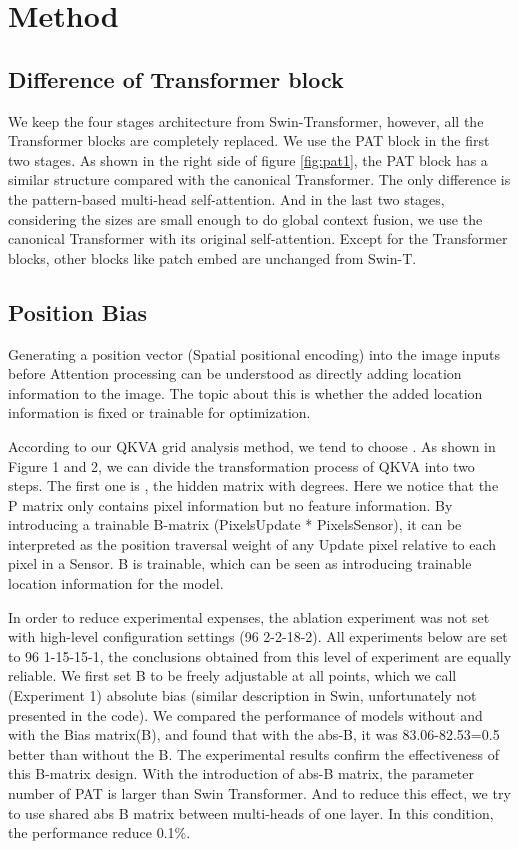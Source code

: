 \documentclass{article}
\theoremstyle{plain}
\theoremstyle{definition}
\theoremstyle{remark}
\begin{document}
\section{Method}
\subsection{Difference of Transformer block}
We keep the four stages architecture from Swin-Transformer, however, all the Transformer blocks are completely replaced. We use the PAT block in the first two stages. As shown in the right side of figure \ref{fig:pat1}, the PAT block has a similar structure compared with the canonical Transformer. The only difference is the pattern-based multi-head self-attention. And in the last two stages, considering the sizes are small enough to do global context fusion, we use the canonical Transformer with its original self-attention. Except for the Transformer blocks, other blocks like patch embed are unchanged from Swin-T.

\subsection{Position Bias}
Generating a position vector (Spatial positional encoding) into the image inputs before Attention processing can be understood as directly adding location information to the image. The topic about this is whether the added location information is fixed or trainable for optimization.

According to our QKVA grid analysis method, we tend to choose . As shown in Figure 1 and 2, we can divide the transformation process of QKVA into two steps. The first one is , the hidden matrix with  degrees. Here we notice that the P matrix only contains pixel information but no feature information. By introducing a trainable B-matrix (PixelsUpdate * PixelsSensor), it can be interpreted as the position traversal weight of any Update pixel relative to each pixel in a Sensor. B is trainable, which can be seen as introducing trainable location information for the model. 

In order to reduce experimental expenses, the ablation experiment was not set with high-level configuration settings (96 2-2-18-2). All experiments below are set to 96 1-15-15-1, the conclusions obtained from this level of experiment are equally reliable.
We first set B to be freely adjustable at all points, which we call (Experiment 1) absolute bias (similar description in Swin, unfortunately not presented in the code). We compared the performance of models without and with the Bias matrix(B), and found that with the abs-B, it was 83.06-82.53=0.5 better than without the B. The experimental results confirm the effectiveness of this B-matrix design. With the introduction of abs-B matrix, the parameter number of PAT is larger than Swin Transformer. And to reduce this effect, we try to use shared abs B matrix between multi-heads of one layer. In this condition, the performance reduce 0.1\%.
\end{document}
